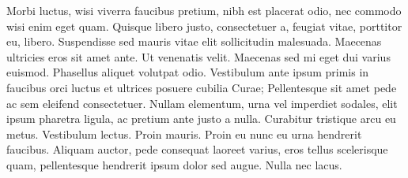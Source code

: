 Morbi luctus, wisi viverra faucibus pretium, nibh est placerat odio, nec commodo wisi enim eget quam. Quisque libero justo, consectetuer a, feugiat vitae, porttitor eu, libero. Suspendisse sed mauris vitae elit sollicitudin malesuada. Maecenas ultricies eros sit amet ante. Ut venenatis velit. Maecenas sed mi eget dui varius euismod. Phasellus aliquet volutpat odio. Vestibulum ante ipsum primis in faucibus orci luctus et ultrices posuere cubilia Curae; Pellentesque sit amet pede ac sem eleifend consectetuer. Nullam elementum, urna vel imperdiet sodales, elit ipsum pharetra ligula, ac pretium ante justo a nulla. Curabitur tristique arcu eu metus. Vestibulum lectus. Proin mauris. Proin eu nunc eu urna hendrerit faucibus. Aliquam auctor, pede consequat laoreet varius, eros tellus scelerisque quam, pellentesque hendrerit ipsum dolor sed augue. Nulla nec lacus.
